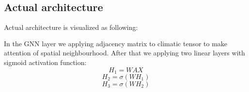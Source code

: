 \documentclass{article}
\begin{document}
\begin{figure}[h]
\end{figure}



\subsection{Actual architecture}
Actual architecture is visualized as following:
\begin{figure}[h]
\end{figure}
\newpage
In the GNN layer we applying adjacency matrix to climatic tensor to make attention of spatial neighbourhood. After that we applying two linear layers with sigmoid activation function:
\begin{equation}
    H_1 = WAX
\end{equation}
\begin{equation}
    H_2 = \sigma(WH_1)
\end{equation}
\begin{equation}
    H_3 = \sigma(WH_2)
\end{equation}
\end{document}
